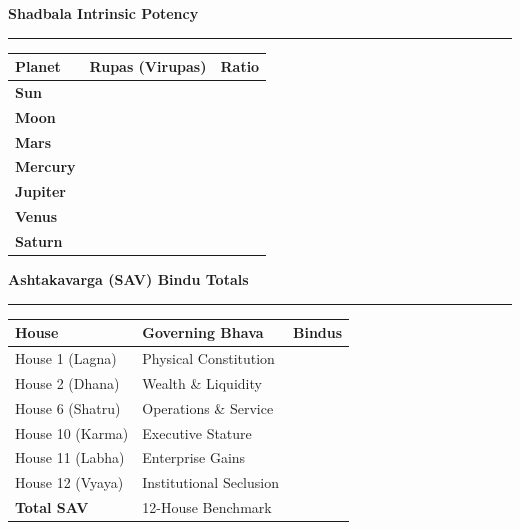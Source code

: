 \documentclass[10pt,oneside]{article}
\newcommand{\CardTitle}[1]{%
  {\sffamily\fontsize{9}{11}\selectfont\bfseries\color{DeepSlate}#1}\par
  \vspace{1mm}%
  {\textcolor{AccentGold}{\rule{18mm}{0.6pt}}}\par
  \vspace{2mm}%
}
\newcommand{\TwoCol}[2]{%
  \begin{minipage}[t]{0.485\linewidth}#1\end{minipage}\hfill
  \begin{minipage}[t]{0.485\linewidth}#2\end{minipage}%
}
\begin{document}
\TwoCol{
  \begin{executivecard}
    \CardTitle{Shadbala Intrinsic Potency}
    \sffamily\fontsize{7.5}{10}\selectfont
    \begin{tabularx}{\linewidth}{@{}l X r@{}}
      \textbf{Planet} & \textbf{Rupas (Virupas)} & \textbf{Ratio} \\
      \midrule
      \textbf{Sun} & \ShadbalaSunScore & \ShadbalaSunRatio \\
      \textbf{Moon} & \ShadbalaMoonScore & \ShadbalaMoonRatio \\
      \textbf{Mars} & \ShadbalaMarsScore & \ShadbalaMarsRatio \\
      \textbf{Mercury} & \ShadbalaMercuryScore & \ShadbalaMercuryRatio \\
      \textbf{Jupiter} & \ShadbalaJupiterScore & \ShadbalaJupiterRatio \\
      \textbf{Venus} & \ShadbalaVenusScore & \ShadbalaVenusRatio \\
      \textbf{Saturn} & \ShadbalaSaturnScore & \ShadbalaSaturnRatio \\
    \end{tabularx}
  \end{executivecard}
}{
  \begin{executivecard}
    \CardTitle{Ashtakavarga (SAV) Bindu Totals}
    \sffamily\fontsize{7.5}{10}\selectfont
    \begin{tabularx}{\linewidth}{@{}l X r@{}}
      \textbf{House} & \textbf{Governing Bhava} & \textbf{Bindus} \\
      \midrule
      House 1 (Lagna) & Physical Constitution & \SAVHouseOneBindus \\
      House 2 (Dhana) & Wealth \& Liquidity & \SAVHouseTwoBindus \\
      House 6 (Shatru) & Operations \& Service & \SAVHouseSixBindus \\
      House 10 (Karma) & Executive Stature & \SAVHouseTenBindus \\
      House 11 (Labha) & Enterprise Gains & \SAVHouseElevenBindus \\
      House 12 (Vyaya) & Institutional Seclusion & \SAVHouseTwelveBindus \\
      \textbf{Total SAV} & 12-House Benchmark & \SAVTotalBindus \\
    \end{tabularx}
  \end{executivecard}
}
\end{document}
